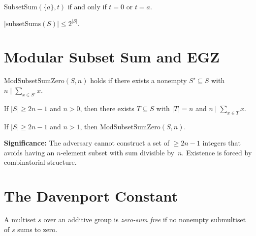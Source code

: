 \begin{theorem}[Singleton]
  \label{thm:subset_sum_singleton}
  \leanok
  $\mathrm{SubsetSum}(\{a\}, t)$ if and only if $t = 0$ or $t = a$.
\end{theorem}

\begin{theorem}
  \label{thm:card_subset_sums_le}
  \leanok
  $|\mathrm{subsetSums}(S)| \leq 2^{|S|}$.
\end{theorem}

\section{Modular Subset Sum and EGZ}

\begin{definition}
  \label{def:mod_subset_sum_zero}
  \leanok
  $\mathrm{ModSubsetSumZero}(S, n)$ holds if there exists a nonempty
  $S' \subseteq S$ with $n \mid \sum_{x \in S'} x$.
\end{definition}

\begin{theorem}
  \label{thm:egz_finset}
  \leanok
  If $|S| \geq 2n - 1$ and $n > 0$, then there exists $T \subseteq S$
  with $|T| = n$ and $n \mid \sum_{x \in T} x$.
\end{theorem}

\begin{theorem}
  \label{thm:egz_mod}
  \leanok
  If $|S| \geq 2n - 1$ and $n > 1$, then $\mathrm{ModSubsetSumZero}(S, n)$.

  \textbf{Significance:} The adversary cannot construct a set of $\geq 2n-1$
  integers that avoids having an $n$-element subset with sum divisible by~$n$.
  Existence is forced by combinatorial structure.
\end{theorem}

\section{The Davenport Constant}

\begin{definition}
  \label{def:zero_sum_free}
  \leanok
  A multiset $s$ over an additive group is \emph{zero-sum free} if no nonempty
  submultiset of $s$ sums to zero.
\end{definition}

